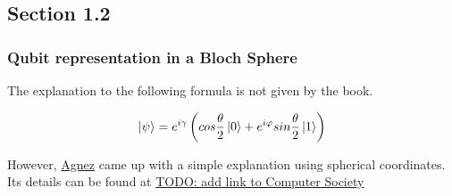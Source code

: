 \subsection{Section 1.2}
\subsubsection{Qubit representation in a Bloch Sphere}

The explanation to the following formula is not given by the book.

\[
\ket{\psi} = e^{i \gamma} \left(
    cos \frac{\theta}{2}\ket{0} + e^{i \varphi} sin \frac{\theta}{2} \ket{1}
\right)
\]

However, \href{https://github.com/victoragnez}{Agnez} came up with a simple explanation using spherical coordinates. Its details can be found at \href{https://www.google.com/}{TODO: add link to Computer Society}